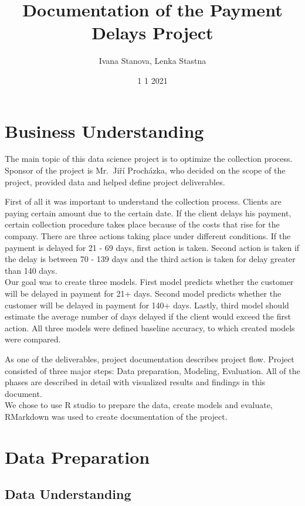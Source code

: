 \documentclass[
]{article}
\title{Documentation of the Payment Delays Project}
\author{Ivana Stanova, Lenka Stastna}
\date{1 1 2021}
\begin{document}
\maketitle

{
\setcounter{tocdepth}{2}
\tableofcontents
}
\hypertarget{business-understanding}{%
\section{Business Understanding}\label{business-understanding}}

The main topic of this data science project is to optimize the collection process. Sponsor of the project is Mr.~Jiří Procházka, who decided on the scope of the project, provided data and helped define project deliverables.

First of all it was important to understand the collection process. Clients are paying certain amount due to the certain date. If the client delays his payment, certain collection procedure takes place because of the costs that rise for the company. There are three actions taking place under different conditions. If the payment is delayed for 21 - 69 days, first action is taken. Second action is taken if the delay is between 70 - 139 days and the third action is taken for delay greater than 140 days.\\
Our goal was to create three models. First model predicts whether the customer will be delayed in payment for 21+ days. Second model predicts whether the customer will be delayed in payment for 140+ days. Lastly, third model should estimate the average number of days delayed if the client would exceed the first action. All three models were defined baseline accuracy, to which created models were compared.

As one of the deliverables, project documentation describes project flow. Project consisted of three major steps: Data preparation, Modeling, Evaluation. All of the phases are described in detail with visualized results and findings in this document.\\
We chose to use R studio to prepare the data, create models and evaluate, RMarkdown was used to create documentation of the project.

\hypertarget{data-preparation}{%
\section{Data Preparation}\label{data-preparation}}

\hypertarget{data-understanding}{%
\subsection{Data Understanding}\label{data-understanding}}
\end{document}

